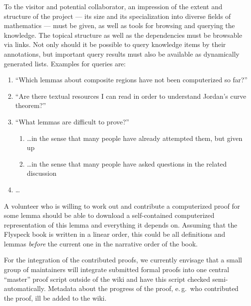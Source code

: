 To the visitor and potential collaborator, an impression of the extent and structure of
the project --- its size and its specialization into diverse fields of
mathematics --- must be given, as well as tools for browsing and querying the knowledge.
The topical structure as well as the dependencies must be browsable via links.  Not only
should it be possible to query knowledge items by their annotations, but important query
results must also be available as dynamically generated lists.  Examples for queries are:

\begin{enumerate}
\item\label{item:proven-lemma} ``Which lemmas about composite regions have not been
  computerized so far?''
\item ``Are there textual resources I can read in order to understand Jordan's curve
  theorem?''
\item ``What lemmas are difficult to prove?''
  \begin{enumerate}
  \item \ldots in the sense that many people have already attempted them, but given up
  \item\label{item:question-count} \ldots in the sense that many people have asked
    questions in the related discussion
  \end{enumerate}
\item \ldots{}
\end{enumerate}

A volunteer who is willing to work out and contribute a computerized
proof for some lemma should be able to download a self-contained
computerized representation of this lemma and everything it depends
on.  Assuming that the Flyspeck book is written in a linear order, this could be all
definitions and lemmas \emph{before} the current one in the narrative order of the
book.  


For the integration of the contributed proofs, we currently envisage
that a small group of maintainers will integrate submitted formal
proofs into one central ``master'' proof script outside of the wiki
and have this script checked semi-automatically.  Metadata about the
progress of the proof, e.\,g.\ who contributed the proof, ill be added
to the wiki.  

